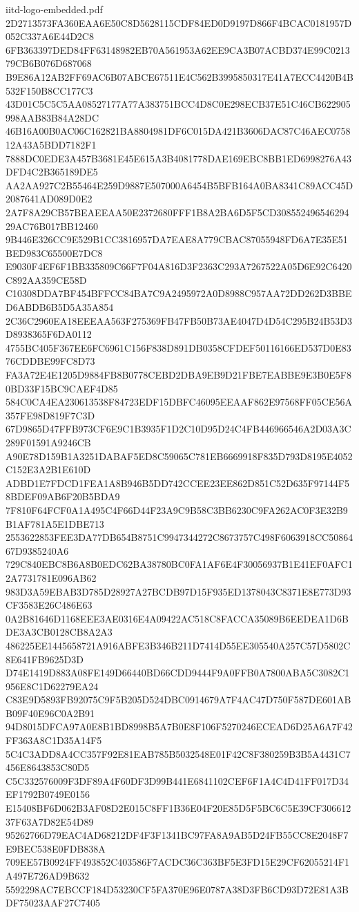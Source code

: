 \begin{filecontents*}[overwrite]{iitd-logo-embedded.pdf}
2D2713573FA360EAA6E50C8D5628115CDF84ED0D9197D866F4BCAC0181957D052C337A6E44D2C8
6FB363397DED84FF63148982EB70A561953A62EE9CA3B07ACBD374E99C021379CB6B076D687068
B9E86A12AB2FF69AC6B07ABCE67511E4C562B3995850317E41A7ECC4420B4B532F150B8CC177C3
43D01C5C5C5AA08527177A77A383751BCC4D8C0E298ECB37E51C46CB622905998AAB83B84A28DC
46B16A00B0AC06C162821BA8804981DF6C015DA421B3606DAC87C46AEC075812A43A5BDD7182F1
7888DC0EDE3A457B3681E45E615A3B4081778DAE169EBC8BB1ED6998276A43DFD4C2B365189DE5
AA2AA927C2B55464E259D9887E507000A6454B5BFB164A0BA8341C89ACC45D2087641AD089D0E2
2A7F8A29CB57BEAEEAA50E2372680FFF1B8A2BA6D5F5CD30855249654629429AC76B017BB12460
9B446E326CC9E529B1CC3816957DA7EAE8A779CBAC87055948FD6A7E35E51BED983C65500E7DC8
E9030F4EF6F1BB335809C66F7F04A816D3F2363C293A7267522A05D6E92C6420C892AA359CE58D
C10308DDA7BF454BFFCC84BA7C9A2495972A0D8988C957AA72DD262D3BBED6ABDB6B5D5A35A854
2C36C2960EA18EEEAA563F275369FB47FB50B73AE4047D4D54C295B24B53D3D8938365F6DA0112
4755BC405F367EE6FC6961C156F838D891DB0358CFDEF50116166ED537D0E8376CDDBE99FC8D73
FA3A72E4E1205D9884FB8B0778CEBD2DBA9EB9D21FBE7EABBE9E3B0E5F80BD33F15BC9CAEF4D85
584C0CA4EA230613538F84723EDF15DBFC46095EEAAF862E97568FF05CE56A357FE98D819F7C3D
67D9865D47FFB973CF6E9C1B3935F1D2C10D95D24C4FB446966546A2D03A3C289F01591A9246CB
A90E78D159B1A3251DABAF5ED8C59065C781EB6669918F835D793D8195E4052C152E3A2B1E610D
ADBD1E7FDCD1FEA1A8B946B5DD742CCEE23EE862D851C52D635F97144F58BDEF09AB6F20B5BDA9
7F810F64FCF0A1A495C4F66D44F23A9C9B58C3BB6230C9FA262AC0F3E32B9B1AF781A5E1DBE713
2553622853FEE3DA77DB654B8751C9947344272C8673757C498F6063918CC5086467D9385240A6
729C840EBC8B6A8B0EDC62BA38780BC0FA1AF6E4F30056937B1E41EF0AFC12A7731781E096AB62
983D3A59EBAB3D785D28927A27BCDB97D15F935ED1378043C8371E8E773D93CF3583E26C486E63
0A2B81646D1168EEE3AE0316E4A09422AC518C8FACCA35089B6EEDEA1D6BDE3A3CB0128CB8A2A3
486225EE1445658721A916ABFE3B346B211D7414D55EE305540A257C57D5802C8E641FB9625D3D
D74E1419D883A08FE149D66440BD66CDD9444F9A0FFB0A7800ABA5C3082C1956E8C1D62279EA24
C83E9D5893FB92075C9F5B205D524DBC0914679A7F4AC47D750F587DE601ABB09F40E96C0A2B91
94D8015DFCA97A0E8B1BD8998B5A7B0E8F106F5270246ECEAD6D25A6A7F42FF363A8C1D35A14F5
5C4C3ADD8A4CC357F92E81EAB785B5032548E01F42C8F380259B3B5A4431C7456E8643853C80D5
C5C332576009F3DF89A4F60DF3D99B441E6841102CEF6F1A4C4D41FF017D34EF1792B0749E0156
E15408BF6D062B3AF08D2E015C8FF1B36E04F20E85D5F5BC6C5E39CF30661237F63A7D82E54D89
95262766D79EAC4AD68212DF4F3F1341BC97FA8A9AB5D24FB55CC8E2048F7E9BEC538E0FDB838A
709EE57B0924FF493852C403586F7ACDC36C363BF5E3FD15E29CF62055214F1A497E726AD9B632
5592298AC7EBCCF184D53230CF5FA370E96E0787A38D3FB6CD93D72E81A3BDF75023AAF27C7405

\end{filecontents*}
